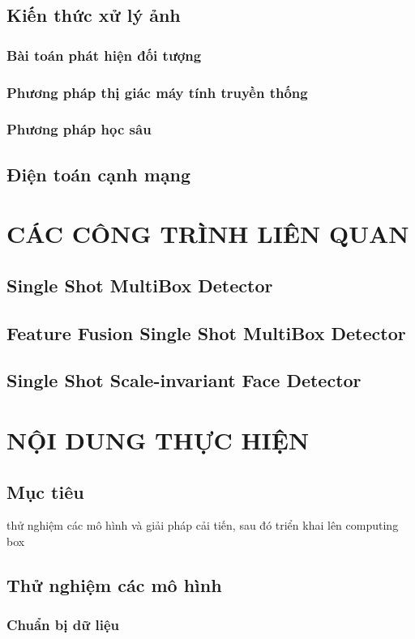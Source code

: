 \documentclass[a4paper]{report}
\begin{document}
\section{Kiến thức xử lý ảnh}
\subsection{Bài toán phát hiện đối tượng}
\subsection{Phương pháp thị giác máy tính truyền thống}
\subsection{Phương pháp học sâu}
\section{Điện toán cạnh mạng}

\chapter{CÁC CÔNG TRÌNH LIÊN QUAN }
\section{Single Shot MultiBox Detector}
\section{Feature Fusion Single Shot MultiBox Detector}
\section{Single Shot Scale-invariant Face Detector }

\chapter{NỘI DUNG THỰC HIỆN}
\section{Mục tiêu} thử nghiệm các mô hình và giải pháp cải tiến, sau đó triển khai lên computing box
\section{Thử nghiệm các mô hình}
\subsection{Chuẩn bị dữ liệu}
\end{document}
